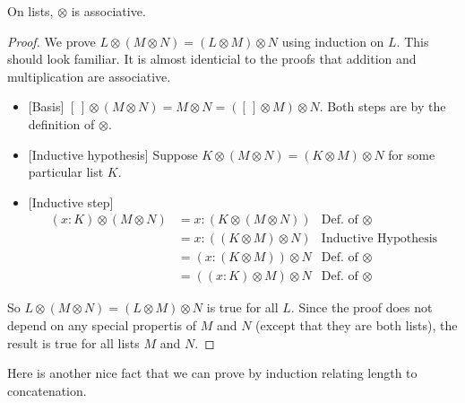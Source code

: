 \begin{lemma}
On lists, $\otimes$ is associative.

\begin{proof}
We prove $L\otimes(M\otimes N) =
  (L\otimes M)\otimes N$ using induction on $L$. This should look
  familiar. It is almost identicial to the proofs that addition and
  multiplication are associative.

  \begin{itemize}
  \item{}[Basis] $[\,]\otimes(M\otimes N) = M\otimes N = ([\,]\otimes M)\otimes
    N$. Both steps are by the definition of $\otimes$.
  \item{} [Inductive hypothesis] Suppose $K\otimes(M\otimes N) = (K\otimes
    M)\otimes N$ for some particular list $K$.
  \item{} [Inductive step]
    \begin{align*}
      (x:K)\otimes (M\otimes N) &= x:(K\otimes (M\otimes N)) &\mbox{Def. of $\otimes$}\\
      &= x:((K\otimes M)\otimes N) &\mbox{Inductive Hypothesis}\\
      &= (x:(K\otimes M))\otimes N &\mbox{Def. of $\otimes$}\\
      &= ((x:K)\otimes M)\otimes N &\mbox{Def. of $\otimes$}
    \end{align*}
  \end{itemize}
  So $L\otimes(M\otimes N) = (L\otimes M)\otimes N$ is true for all $L$. Since the proof
  does not depend on any special propertis of $M$ and $N$ (except that they are both lists),
  the result is true for all lists $M$ and $N$.
\end{proof}
\end{lemma}

\ipadbreak

Here is another nice fact that we can prove by induction relating
length to concatenation.

